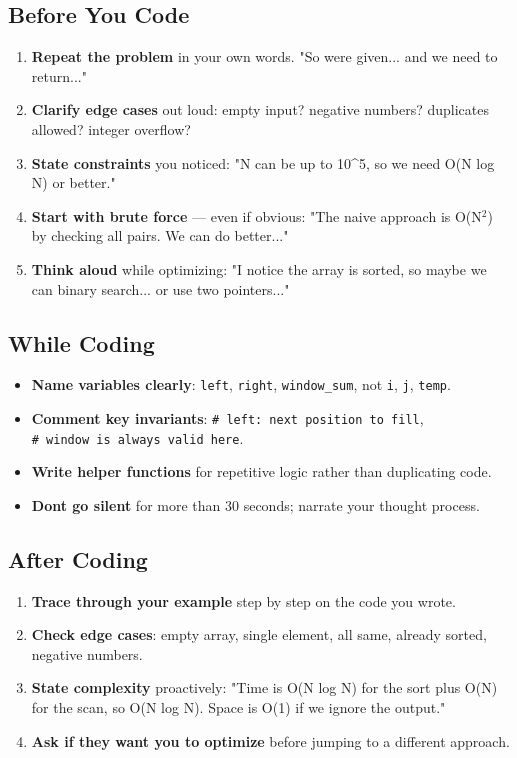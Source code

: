 \documentclass[11pt]{article}
\providecommand{\tightlist}{\setlength{\itemsep}{1pt}\setlength{\parskip}{0pt}}
\begin{document}
\subsection{Before You Code}\label{before-you-code}

\begin{enumerate}
\def\labelenumi{\arabic{enumi}.}
\tightlist
\item
  \textbf{Repeat the problem} in your own words. "So we\textquotesingle re given... and we need to return..."
\item
  \textbf{Clarify edge cases} out loud: empty input? negative numbers? duplicates allowed? integer overflow?
\item
  \textbf{State constraints} you noticed: "N can be up to 10\^{}5, so we need O(N log N) or better."
\item
  \textbf{Start with brute force} --- even if obvious: "The naive approach is O(N\(^2\)) by checking all pairs. We can do better..."
\item
  \textbf{Think aloud} while optimizing: "I notice the array is sorted, so maybe we can binary search... or use two pointers..."
\end{enumerate}

\subsection{While Coding}\label{while-coding}

\begin{itemize}
\tightlist
\item
  \textbf{Name variables clearly}: \texttt{left}, \texttt{right}, \texttt{window\_sum}, not \texttt{i}, \texttt{j}, \texttt{temp}.
\item
  \textbf{Comment key invariants}: \texttt{\#\ left:\ next\ position\ to\ fill}, \texttt{\#\ window\ is\ always\ valid\ here}.
\item
  \textbf{Write helper functions} for repetitive logic rather than duplicating code.
\item
  \textbf{Don\textquotesingle t go silent} for more than 30 seconds; narrate your thought process.
\end{itemize}

\subsection{After Coding}\label{after-coding}

\begin{enumerate}
\def\labelenumi{\arabic{enumi}.}
\tightlist
\item
  \textbf{Trace through your example} step by step on the code you wrote.
\item
  \textbf{Check edge cases}: empty array, single element, all same, already sorted, negative numbers.
\item
  \textbf{State complexity} proactively: "Time is O(N log N) for the sort plus O(N) for the scan, so O(N log N). Space is O(1) if we ignore the output."
\item
  \textbf{Ask if they want you to optimize} before jumping to a different approach.
\end{enumerate}
\end{document}
